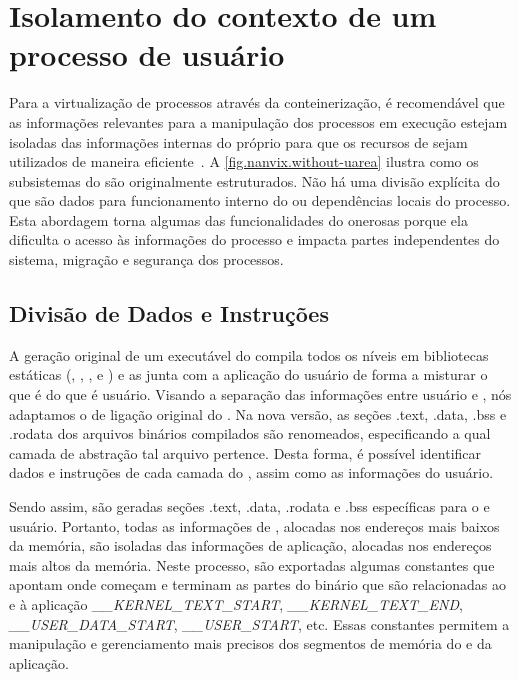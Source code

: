 \section{Isolamento do contexto de um processo de usuário}
\label{sec.dev.kernel-usuario}

Para a virtualização de processos através da conteinerização, é recomendável que as informações relevantes para a manipulação dos processos em execução estejam isoladas das informações internas do próprio \os para que os recursos de \hardware sejam utilizados de maneira eficiente~\cite{live-vm-migration-techniques}.
A \autoref{fig.nanvix.without-uarea} ilustra como os subsistemas do \nanvix são originalmente estruturados. Não há uma divisão explícita do que são dados para funcionamento interno do \os ou dependências locais do processo.
Esta abordagem torna algumas das funcionalidades do \os onerosas porque ela dificulta o acesso às informações do processo e impacta partes independentes do sistema, \eg migração e segurança dos processos.

\subsection{Divisão de Dados e Instruções}
\label{sec.divisao-dados-instrucao}

    A geração original de um executável do \nanvix compila todos os níveis em bibliotecas estáticas (\hal, \microkernel, \libnanvix, \ulibc e \multikernel) e as junta com a aplicação do usuário de forma a misturar o que é  do que é usuário.
    Visando a separação das informações entre usuário e , nós adaptamos o \script de ligação original do \nanvix. Na nova versão, as seções .text, .data, .bss e .rodata dos arquivos binários compilados são renomeados, especificando a qual camada de abstração tal arquivo pertence. Desta forma, é possível identificar dados e instruções de cada camada do \nanvix, assim como as informações do usuário. 
    
    Sendo assim, são geradas seções .text, .data, .rodata e .bss específicas para o  e usuário. Portanto, todas as informações de , alocadas nos endereços mais baixos da memória, são isoladas das informações de aplicação, alocadas nos endereços mais altos da memória. Neste processo, são exportadas algumas constantes que apontam onde começam e terminam as partes do binário que são relacionadas ao  e à aplicação \eg \textit{\_\_KERNEL\_TEXT\_START}, \textit{\_\_KERNEL\_TEXT\_END}, \textit{\_\_USER\_DATA\_START}, \textit{\_\_USER\_START}, etc. Essas constantes permitem a manipulação e gerenciamento mais precisos dos segmentos de memória do  e da aplicação.
    
